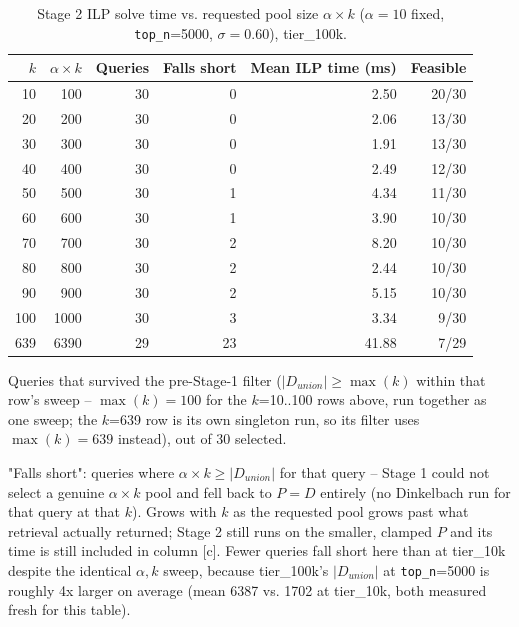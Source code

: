 \begin{table}[t]
\centering
\begin{threeparttable}
\caption{Stage 2 ILP solve time vs. requested pool size $\alpha{\times}k$ ($\alpha=10$ fixed,
\texttt{top\_n}=5000, $\sigma=0.60$), tier\_100k.}
\label{tab:wdc-ilp-scaling-tier100k}
\begin{tabular}{rrrrrr}
\toprule
$k$ & $\alpha{\times}k$ & Queries\tnote{a} & Falls short\tnote{b} & Mean ILP time (ms)\tnote{c} & Feasible\tnote{d} \\
\midrule
 10 &  100 & 30 & 0 & 2.50 & 20/30 \\
 20 &  200 & 30 & 0 & 2.06 & 13/30 \\
 30 &  300 & 30 & 0 & 1.91 & 13/30 \\
 40 &  400 & 30 & 0 & 2.49 & 12/30 \\
 50 &  500 & 30 & 1 & 4.34 & 11/30 \\
 60 &  600 & 30 & 1 & 3.90 & 10/30 \\
 70 &  700 & 30 & 2 & 8.20 & 10/30 \\
 80 &  800 & 30 & 2 & 2.44 & 10/30 \\
 90 &  900 & 30 & 2 & 5.15 & 10/30 \\
100 & 1000 & 30 & 3 & 3.34 &  9/30 \\
639\tnote{f} & 6390 & 29\tnote{g} & 23 & 41.88 & 7/29 \\
\bottomrule
\end{tabular}
\begin{tablenotes}
\footnotesize
\item[a] Queries that survived the pre-Stage-1 filter ($|D_{union}| \geq \max(k)$ within that row's
  sweep -- $\max(k)=100$ for the $k$=10..100 rows above, run together as one sweep; the $k$=639 row
  is its own singleton run, so its filter uses $\max(k)=639$ instead), out of 30 selected.
\item[b] "Falls short": queries where $\alpha{\times}k \geq |D_{union}|$ for that query -- Stage 1
  could not select a genuine $\alpha{\times}k$ pool and fell back to $P=D$ entirely (no Dinkelbach
  run for that query at that $k$). Grows with $k$ as the requested pool grows past what retrieval
  actually returned; Stage 2 still runs on the smaller, clamped $P$ and its time is still included
  in column [c]. Fewer queries fall short here than at tier\_10k despite the identical $\alpha,k$
  sweep, because tier\_100k's $|D_{union}|$ at \texttt{top\_n}=5000 is roughly 4x larger on average
  (mean 6387 vs. 1702 at tier\_10k, both measured fresh for this table).

\end{tablenotes}
\end{threeparttable}
\end{table}
